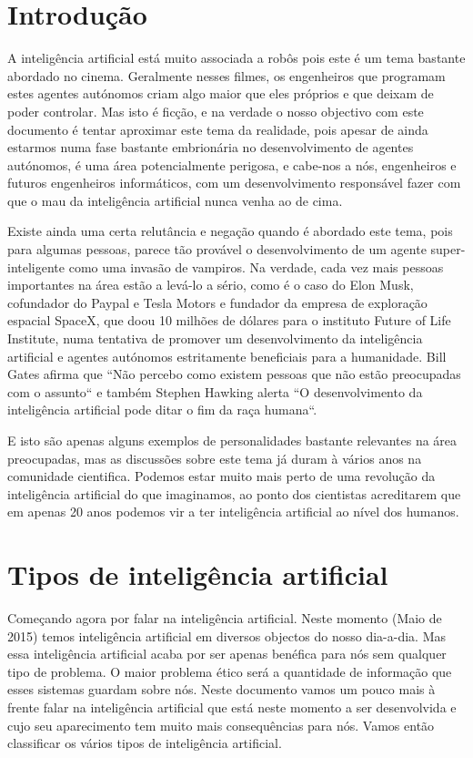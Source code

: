 \documentclass[runningheads,a4paper]{llncs}
\begin{document}
\section{Introdução}

A inteligência artificial está muito associada a robôs pois este é um tema bastante abordado no cinema. Geralmente nesses filmes, os engenheiros que programam estes agentes autónomos criam algo maior que eles próprios e que deixam de poder controlar. Mas isto é ficção, e na verdade o nosso objectivo com este documento é tentar aproximar este tema da realidade, pois apesar de ainda estarmos numa fase bastante embrionária no desenvolvimento de agentes autónomos, é uma área potencialmente perigosa, e cabe-nos a nós, engenheiros e futuros engenheiros informáticos, com um desenvolvimento responsável fazer com que o mau da inteligência artificial nunca venha ao de cima.

Existe ainda uma certa relutância e negação quando é abordado este tema, pois para algumas pessoas, parece tão provável o desenvolvimento de um agente super-inteligente como uma invasão de vampiros. Na verdade, cada vez mais pessoas importantes na área estão a levá-lo a sério, como é o caso do Elon Musk, cofundador do Paypal e Tesla Motors e fundador da empresa de exploração espacial SpaceX, que doou 10 milhões de dólares para o instituto Future of Life Institute\cite{FLI}, numa tentativa de promover um desenvolvimento da inteligência artificial e agentes autónomos estritamente beneficiais para a humanidade. Bill Gates afirma que ``Não percebo como existem pessoas que não estão preocupadas com o assunto``\cite{gates} e também Stephen Hawking alerta ``O desenvolvimento da inteligência artificial pode ditar o fim da raça humana``\cite{hawking}.

E isto são apenas alguns exemplos de personalidades bastante relevantes na área preocupadas, mas as discussões sobre este tema já duram à vários anos na comunidade cientifica. Podemos estar muito mais perto de uma revolução da inteligência artificial do que imaginamos, ao ponto dos cientistas acreditarem que em apenas 20 anos podemos vir a ter inteligência artificial ao nível dos humanos.

\section{Tipos de inteligência artificial}

Começando agora por falar na inteligência artificial. Neste momento (Maio de 2015) temos inteligência artificial em diversos objectos do nosso dia-a-dia. Mas essa inteligência artificial acaba por ser apenas benéfica para nós sem qualquer tipo de problema. O maior problema ético será a quantidade de informação que esses sistemas guardam sobre nós. Neste documento vamos um pouco mais à frente falar na inteligência artificial que está neste momento a ser desenvolvida e cujo seu aparecimento tem muito mais consequências para nós. Vamos então classificar os vários tipos de inteligência artificial.
\end{document}
